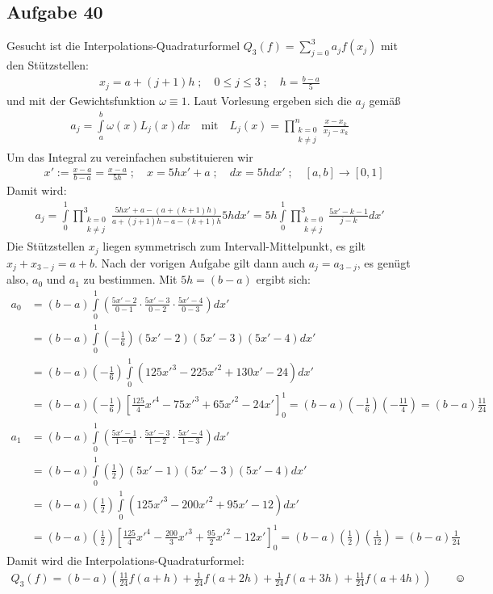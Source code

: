 \subsection*{Aufgabe 40}
Gesucht ist die Interpolations-Quadraturformel $Q_3(f) = \sum_{j=0}^3 a_j f(x_j)$
mit den Stützstellen:
\begin{align*}
  x_j = a + (j + 1) h\;;\quad 0 \le j \le 3 \;;\quad h = \frac{b-a}{5}
\end{align*}
und mit der Gewichtsfunktion $\omega \equiv 1$. Laut Vorlesung ergeben sich die $a_j$ gemäß
\begin{align*}
  a_j = \int \limits_a^b \omega(x) L_j(x) dx \quad \text{mit} \quad
 L_j(x) = \prod_{\substack{k = 0 \\k \neq j}}^n \frac{x - x_k}{x_j - x_k}
\end{align*}
Um das Integral zu vereinfachen substituieren wir
\begin{align*}
  & x' := \frac{x - a}{b - a} = \frac{x - a}{5 h} \;;\quad x = 5 h x' + a \;;\quad dx = 5 h dx' \;;\quad
  [a,b] \rightarrow [0,1]
\end{align*}
Damit wird:
\begin{align*}
  a_j = \int \limits_0^1 \prod_{\substack{k = 0 \\k \neq j}}^3
  \frac{5 h x' + a - (a + (k+1) h)}{a + (j+1)h - a - (k+1) h } 5 h dx' =
  5 h \int \limits_0^1 \prod_{\substack{k = 0 \\k \neq j}}^3
  \frac{5 x' - k - 1}{j-k} d x'
\end{align*}
Die Stützstellen $x_j$ liegen symmetrisch zum Intervall-Mittelpunkt, es gilt
$x_j + x_{3-j} = a + b$. Nach der vorigen Aufgabe gilt dann auch $a_j = a_{3-j}$,
es genügt also, $a_0$ und $a_1$ zu bestimmen. Mit $5 h = (b - a)$ ergibt sich:
\begin{align*}
a_0 & = (b-a) \int \limits_0^1 \left(\frac{5x'-2}{0-1} \cdot \frac{5x'-3}{0-2} \cdot \frac{5x'-4}{0-3} \right) dx' \\
  & = (b-a) \int \limits_0^1 \left(-\frac{1}{6}\right)(5x'-2)(5x'-3)(5x'-4) dx' \\
  & = (b-a) \left(-\frac{1}{6}\right) \int \limits_0^1  (125 x'^3 - 225 x'^2 + 130 x' - 24) dx'\\
  & = (b-a) \left(-\frac{1}{6}\right) \left[\frac{125}{4}x'^4 - 75x'^3 + 65 x'^2 - 24x' \right]_0^1
    = (b-a) \left(-\frac{1}{6}\right) \left(-\frac{11}{4}\right) = (b-a) \frac{11}{24}\\
a_1 & = (b-a) \int \limits_0^1 \left(\frac{5x'-1}{1-0} \cdot \frac{5x'-3}{1-2} \cdot \frac{5x'-4}{1-3} \right) dx' \\
  & = (b-a) \int \limits_0^1 \left(\frac{1}{2}\right)(5x'-1)(5x'-3)(5x'-4) dx' \\
  & = (b-a)  \left(\frac{1}{2}\right) \int \limits_0^1(125 x'^3 - 200 x'^2 + 95 x' - 12) dx'\\
  & = (b-a) \left(\frac{1}{2}\right) \left[\frac{125}{4}x'^4 - \frac{200}{3} x'^3 + \frac{95}{2} x'^2 - 12x' \right]_0^1
    = (b-a) \left(\frac{1}{2}\right) \left(\frac{1}{12}\right) = (b-a) \frac{1}{24}
\end{align*}
Damit wird die Interpolations-Quadraturformel:
\begin{align*}
  Q_3(f) = (b-a) \left(\frac{11}{24}f(a+h) +  \frac{1}{24}f(a+2h) +  \frac{1}{24}f(a+3h) +  \frac{11}{24}f(a+4h) \right)
  \qquad \smiley{}
\end{align*}






